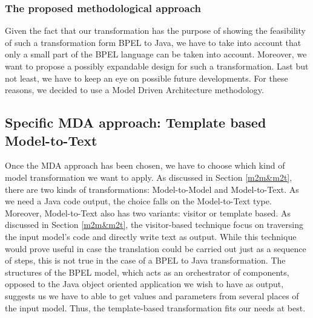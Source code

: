 \subsubsection{The proposed methodological approach}
Given the fact that our transformation has the purpose of showing the feasibility of such a transformation form BPEL to Java, we have to take into account that only a small part of the BPEL language can be taken into account. Moreover, we want to propose a possibly expandable design for such a transformation. Last but not least, we have to keep an eye on possible future developments. For these reasons, we decided to use a Model Driven Architecture methodology.

\subsection{Specific MDA approach: Template based Model-to-Text}
Once the MDA approach has been chosen, we have to choose which kind of model transformation we want to apply. As discussed in Section \ref{m2m&m2t}, there are two kinds of transformations: Model-to-Model and Model-to-Text. As we need a Java code output, the choice falls on the Model-to-Text type.
Moreover, Model-to-Text also has two variants: visitor or template based. As discussed in Section \ref{m2m&m2t}, the visitor-based technique focus on traversing the input model's code and directly write text as output. While this technique would prove useful in case the translation could be carried out just as a sequence of steps, this is not true in the case of a BPEL to Java transformation. The structures of the BPEL model, which acts as an orchestrator of components, opposed to the Java object oriented application we wish to have as output, suggests us we have to able to get values and parameters from several places of the input model. Thus, the template-based transformation fits our needs at best.

